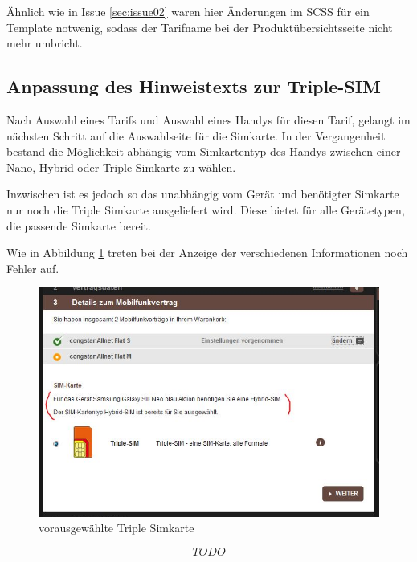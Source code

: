 \documentclass[11pt,a4paper]{article} %
\begin{document}
Ähnlich wie in Issue \ref{sec:issue02} waren hier Änderungen im SCSS für ein Template notwenig, sodass
der Tarifname bei der Produktübersichtsseite nicht mehr umbricht.


\subsection{Anpassung des Hinweistexts zur Triple-SIM} 

Nach Auswahl eines Tarifs und Auswahl eines Handys für diesen Tarif, gelangt im nächsten Schritt 
auf die Auswahlseite für die Simkarte. In der Vergangenheit bestand die Möglichkeit abhängig vom
Simkartentyp des Handys zwischen einer Nano, Hybrid oder Triple Simkarte zu wählen.

Inzwischen ist es jedoch so das unabhängig vom Gerät und benötigter Simkarte nur noch die Triple Simkarte
ausgeliefert wird. Diese bietet für alle Gerätetypen, die passende Simkarte bereit.

Wie in Abbildung \ref{fig:triple} treten bei der Anzeige der verschiedenen Informationen noch Fehler auf.

\begin{figure}[h] \label{fig:triple}
\includegraphics[width=\textwidth]{images/triple.PNG}
\caption{vorausgewählte Triple Simkarte \cite{ccpp}}
\centering
\end{figure}

$$TODO$$



\newpage



\end{document}
